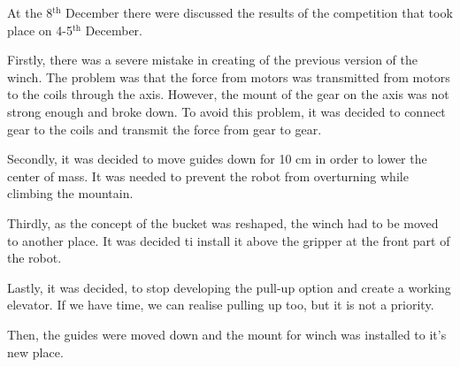 \begin{enumerate*}
  \item At the 8$^\text{th}$ December there were discussed the results of the competition that took place on 4-5$^\text{th}$ December.
  \begin{enumerate*}
  	
  	\item Firstly, there was a severe mistake in creating of the previous version of the winch. The problem was that the force from motors was transmitted from motors to the coils through the axis. However, the mount of the gear on the axis was not strong enough and broke down. To avoid this problem, it was decided to connect gear to the coils and transmit the force from gear to gear.
  	
  	\item Secondly, it was decided to move guides down for 10 cm in order to lower the center of mass. It was needed to prevent the robot from overturning while climbing the mountain.
  	
  	\item Thirdly, as the concept of the bucket was reshaped, the winch had to be moved to another place. It was decided ti install it above the gripper at the front part of the robot.
  	
  	\item Lastly, it was decided, to stop developing the pull-up option and create a working elevator. If we have time, we can realise pulling up too, but it is not a priority.
  	
  \end{enumerate*}

  \item Then, the guides were moved down and the mount for winch was installed to it's new place. %
  


\end{enumerate*}
